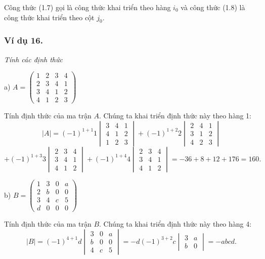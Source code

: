 Công thức (1.7) gọi là công thức khai triển theo hàng \(i_0\) và công thức (1.8) là công thức khai triển theo cột \(j_0\).

\subsubsection*{Ví dụ 16.}
\textit{Tính các định thức}

a) \( A = \begin{pmatrix}
1 & 2 & 3 & 4 \\
2 & 3 & 4 & 1 \\
3 & 4 & 1 & 2 \\
4 & 1 & 2 & 3
\end{pmatrix} \)

Tính định thức của ma trận \(A\). Chúng ta khai triển định thức này theo hàng 1:
\[
|A| = (-1)^{1+1} 1 \begin{vmatrix}
3 & 4 & 1 \\
4 & 1 & 2 \\
1 & 2 & 3
\end{vmatrix}
+ (-1)^{1+2} 2 \begin{vmatrix}
2 & 4 & 1 \\
3 & 1 & 2 \\
4 & 2 & 3
\end{vmatrix}
\]
\[
+ (-1)^{1+3} 3 \begin{vmatrix}
2 & 3 & 4 \\
3 & 4 & 1 \\
4 & 1 & 2
\end{vmatrix}
+ (-1)^{1+4} 4 \begin{vmatrix}
2 & 3 & 4 \\
3 & 4 & 1 \\
4 & 1 & 2
\end{vmatrix}
= -36 + 8 + 12 + 176 = 160.
\]

b) \( B = \begin{pmatrix}
1 & 3 & 0 & a \\
2 & b & 0 & 0 \\
3 & 4 & c & 5 \\
d & 0 & 0 & 0
\end{pmatrix} \)

Tính định thức của ma trận \(B\). Chúng ta khai triển định thức này theo hàng 4:
\[
|B| = (-1)^{4+1} d \begin{vmatrix}
3 & 0 & a \\
b & 0 & 0 \\
4 & c & 5
\end{vmatrix}
= -d(-1)^{3+2} c \begin{vmatrix}
3 & a \\
b & 0
\end{vmatrix}
= -abcd.
\]


